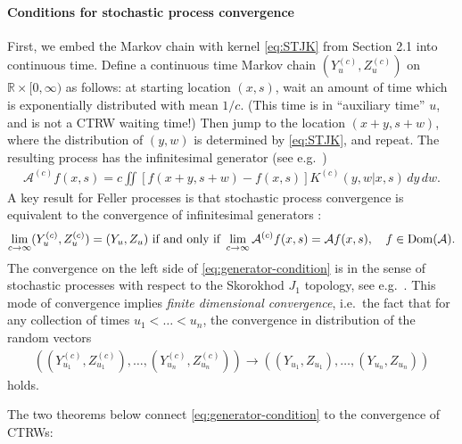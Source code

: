 \documentclass[a4paper,12pt]{elsarticle}
\numberwithin{equation}{section}
\theoremstyle{plain}
\theoremstyle{definition}
\theoremstyle{remark}
\numberwithin{equation}{section}
\newcommand{\spc}{\mathbb R}
\newcommand{\spctim}{\spc \times [0,\infty)}
\newcommand{\1}{\mathbf 1}
\begin{document}
\paragraph{Conditions for stochastic process convergence}
First, we embed the Markov chain with kernel \eqref{eq:STJK} from 
Section 2.1 into continuous time. Define a continuous time Markov 
chain $(Y^{(c)}_u, Z^{(c)}_u)$ on 
$\spctim$ as follows: at starting location $(x,s)$, wait an amount of time which is exponentially distributed with mean $1/c$. (This time is in ``auxiliary time'' $u$, and is not a CTRW waiting time!) Then jump to the location $(x+y, s+w)$, where the distribution of $(y,w)$ is determined by \eqref{eq:STJK}, and repeat. The resulting process has the infinitesimal generator
(see e.g.\ \cite[Proposition 17.2]{Kallenberg}) 
\begin{align} \label{eq:jump-process-generator}
\mathcal A^{(c)} f(x,s) = c \iint [f(x+y, s+w) - f(x,s)] K^{(c)}(y,w | x,s)\,dy\,dw.
\end{align}
A key result for Feller processes is that stochastic process convergence is equivalent to the convergence of infinitesimal generators \cite[Theorem 17.25]{Kallenberg}:
\begin{align} \label{eq:generator-condition}
\lim_{c \to \infty}(Y^{(c)}_u, Z^{(c)}_u) = (Y_u, Z_u)
\text{ if and only if }
\lim_{c \to \infty} \mathcal A^{(c)}f(x,s) = \mathcal A f(x,s), 
\quad f \in {\rm Dom}(\mathcal A).
\end{align}
The convergence on the left side of \eqref{eq:generator-condition} is in the sense of stochastic processes with respect to the Skorokhod $J_1$ topology, see e.g.\ \cite{Whitt2010}. This mode of convergence implies \emph{finite 
dimensional convergence}, i.e.\ the fact that for any collection
of times $u_1 < \ldots < u_n$, the convergence in distribution of the 
random vectors
\begin{align}
\left((Y^{(c)}_{u_1}, Z^{(c)}_{u_1}), \ldots, (Y^{(c)}_{u_n}, Z^{(c)}_{u_n}) \right) 
\to 
\left((Y_{u_1}, Z_{u_1}), \ldots, (Y_{u_n}, Z_{u_n}) \right)
\end{align}
holds. 

The two theorems below connect \eqref{eq:generator-condition} to the convergence of CTRWs: 
\end{document}
